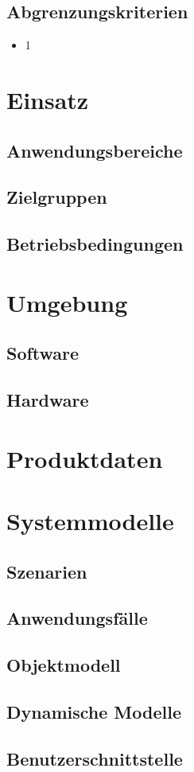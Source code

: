 \documentclass[a4paper]{scrreprt}
\begin{document}
\section{Abgrenzungskriterien}
\begin{itemize} 
\item 1
\end{itemize} 
 
\chapter{Einsatz}
 
\section{Anwendungsbereiche}
 
\section{Zielgruppen}
 
\section{Betriebsbedingungen}
 
\chapter{Umgebung}
 
\section{Software}
 
\section{Hardware}
 
\chapter{Produktdaten}

\chapter{Systemmodelle}
\section{Szenarien}
\section{Anwendungsfälle}
\section{Objektmodell}
\section{Dynamische Modelle}
\section{Benutzerschnittstelle}
\clearpage
\printglossary 
\end{document}
